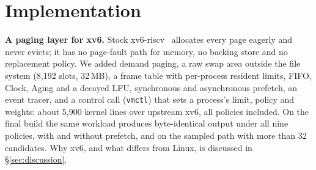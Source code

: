 \documentclass{article}
\newcommand{\xv}{xv6-riscv\xspace}
\newcommand{\clock}{Clock\xspace}
\newcommand{\finding}[1]{\textbf{#1}\hspace{0.4em}}
\begin{document}
\section{Implementation}
\label{sec:impl}

\finding{A paging layer for xv6.} Stock \xv~\citep{xv6} allocates every page eagerly and
never evicts; it has no page-fault path for memory, no backing store and no
replacement policy. We added demand paging, a raw swap area outside the file system
(8,192 slots, 32\,MB), a frame table with per-process resident limits, FIFO, \clock,
Aging and a decayed LFU, synchronous and asynchronous prefetch, an event tracer, and a
control call (\texttt{vmctl}) that sets a process's limit, policy and weights: about
5,900 kernel lines over upstream xv6, all policies included. On the final build the same
workload produces byte-identical output under all nine policies, with and without
prefetch, and on the sampled path with more than 32 candidates.
Why xv6, and what differs from Linux, is discussed in \S\ref{sec:discussion}.
\end{document}
